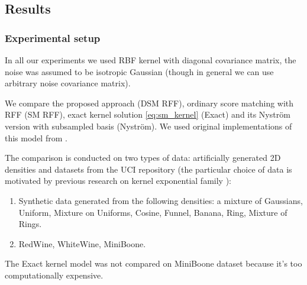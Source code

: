 \subsection{Results}
\label{chap:experiments}
\subsubsection{Experimental setup}
In all our experiments we used RBF kernel with diagonal covariance matrix,
the noise was assumed to be isotropic Gaussian (though in general
we can use arbitrary noise covariance matrix).

We compare the proposed approach (DSM RFF),
ordinary score matching with RFF (SM RFF),
exact kernel solution \eqref{eq:sm_kernel} (Exact) and
its Nystr\"om version with subsampled basis \cite{sutherland2017efficient} (Nystr\"om).
We used original implementations of this model from \cite{GrettonGit}.

The comparison is conducted on two types of data: artificially generated 2D densities
and datasets from the UCI repository \cite{UCI}
(the particular choice of data is motivated by previous research on kernel exponential family
\cite{sutherland2017efficient, Gretton2015, GrettonDeep}):
\begin{enumerate}
    \item Synthetic data generated from the following densities: a mixture of Gaussians, Uniform, Mixture on Uniforms, Cosine, Funnel, Banana, Ring, Mixture of Rings.
    \item RedWine, WhiteWine, MiniBoone.
\end{enumerate}
The Exact kernel model was not compared on MiniBoone dataset
because it's too computationally expensive.

